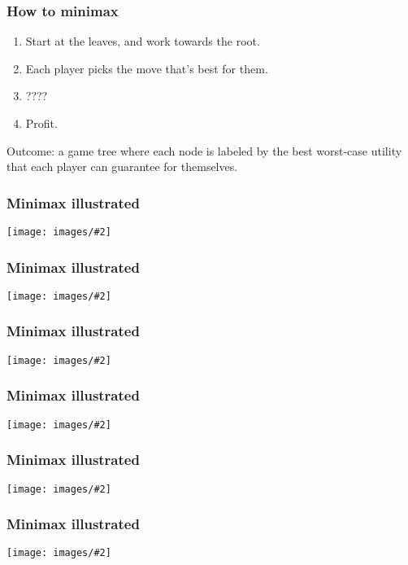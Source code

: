 \documentclass[table]{beamer}
\newcommand\img[2]{\texttt{[image: images/\#2]}}
\begin{document}
\begin{frame}
	\frametitle{How to minimax}
	\begin{enumerate}
		\item Start at the leaves, and work towards the root.
		\item Each player picks the move that's best for them.
		\item ????
		\item Profit.
	\end{enumerate}

	\vspace{5ex}

	Outcome: a game tree where each node is labeled by the \alert{best
	worst-case} utility that each player can guarantee for themselves.
\end{frame}

\begin{frame}
	\frametitle{Minimax illustrated}
	\begin{center}
		\img{1}{games-1.jpg}
	\end{center}
\end{frame}

\begin{frame}
	\frametitle{Minimax illustrated}
	\begin{center}
		\img{1}{games-2.jpg}
	\end{center}
\end{frame}

\begin{frame}
	\frametitle{Minimax illustrated}
	\begin{center}
		\img{1}{games-3.jpg}
	\end{center}
\end{frame}

\begin{frame}
	\frametitle{Minimax illustrated}
	\begin{center}
		\img{1}{games-4.jpg}
	\end{center}
\end{frame}

\begin{frame}
	\frametitle{Minimax illustrated}
	\begin{center}
		\img{1}{games-5.jpg}
	\end{center}
\end{frame}

\begin{frame}
	\frametitle{Minimax illustrated}
	\begin{center}
		\img{1}{games-6.jpg}
	\end{center}
\end{frame}
\end{document}
